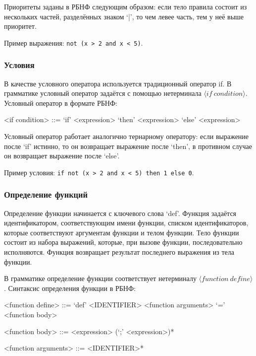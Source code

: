 \documentclass[12pt,a4paper,oneside]{extarticle}
\begin{document}
            Приоритеты заданы в РБНФ следующим образом: если тело правила состоит из нескольких частей, разделённых знаком `|', то чем левее часть, тем у неё выше приоритет.

            Пример выражения: \lstinline$not (x > 2 and x < 5)$.

        \subsubsection{Условия}
            В качестве условного оператора используется традиционный оператор if. В грамматике условный оператор задаётся с помощью нетерминала $\langle if~condition \rangle$. Условный оператор в формате РБНФ:
            \begin{grammar}
                <if condition> ::= `if' <expression> `then' <expression> `else' <expression>
            \end{grammar}
            Условный оператор работает аналогично тернарному оператору: если выражение после `if' истинно, то он возвращает выражение после `then', в противном случае он возвращает выражение после `else'.

            Пример условия: \lstinline$if not (x > 2 and x < 5) then 1 else 0$.

        \subsubsection{Определение функций}
            Определение функции начинается с ключевого слова `def'.
            Функция задаётся идентификатором, соответствующим имени функции, списком идентификаторов, которые соответствуют аргументам функции и телом функции.
            Тело функции состоит из набора выражений, которые, при вызове функции, последовательно исполняются.
            Функция возвращает результат последнего выражения из тела функции.

            В грамматике определение функции соответствует нетерминалу $\langle function~define \rangle$. Синтаксис определения функции в РБНФ:

            \begin{grammar}
                <function define> ::= `def' <IDENTIFIER> <function arguments> `=' <function body>

                <function body> ::= <expression> (`;' <expression>)*

                <function arguments> ::= <IDENTIFIER>*
            \end{grammar}
\end{document}

